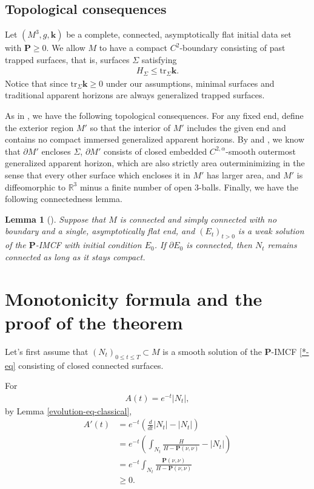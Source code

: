 \documentclass[11pt,letterpaper]{amsart}
\newtheorem{lem}[thm]{Lemma}
\theoremstyle{definition}
\theoremstyle{remark}
\newcommand{\Pten}{\mathbf P}
\newcommand{\kten}{\mathbf k}
\begin{document}
\subsection{Topological consequences}
Let $(M^3, g, \kten)$ be a complete, connected, asymptotically flat initial data set with $\Pten \geq 0$. We allow $M$ to have a compact $C^2$-boundary consisting of past trapped surfaces, that is, surfaces $\Sigma $ satisfying
\begin{align*}
	H_{\Sigma } \leq \mathrm{tr}_{\Sigma }\kten.
\end{align*} 
Notice that since $\mathrm{tr}_{\Sigma } \kten \geq 0$ under our assumptions, minimal surfaces and traditional apparent horizons are always generalized trapped surfaces. 

As in \cite[Section 5]{Dong26SigmaIMCF}, we have the following topological consequences. For any fixed end, define the exterior region $M'$ so that the interior of $M'$ includes the given end and contains no compact immersed generalized apparent horizons. By \cite[Theorem 1.1]{Eichmair10} and \cite[Theorem 5.1]{EGP13}, we know that $\partial M'$ encloses $\Sigma $, $\partial M'$ consists of closed embedded $C^{2,\alpha }$-smooth outermost generalized apparent horizon, which are also strictly area outerminimizing in the sense that every other surface which encloses it in $M'$ has larger area, and  $M'$ is diffeomorphic to $\mathbb{R}^3$ minus a finite number of open $3$-balls. Finally, we have the following connectedness lemma.
\begin{lem}[{\cite[Lemma 5.9]{Dong26SigmaIMCF}}]
			Suppose that $M$ is connected and simply connected with no boundary and a single, asymptotically flat end, and $(E_t)_{t>0}$ is a weak solution of the $\Pten $-IMCF with initial condition $E_0$. If $\partial E_0$ is connected, then $N_t$ remains connected as long as it stays compact.
\end{lem}




\section{Monotonicity formula and the proof of the theorem}
\label{section-monotone}
Let's first assume that $(N_{t})_{0 \leq t \leq T}\subset M$ is a smooth solution of the $\Pten$-IMCF \ref{*-eq} consisting of closed connected surfaces.

For 
\begin{align*}
	A(t) = e ^{-t}|N_t|,
\end{align*} 
by Lemma \ref{evolution-eq-classical}, 
\begin{align*}
	A'(t) &= e ^{-t} \left( \frac{d}{d t}|N_t| - |N_t| \right)\\
	      &= e ^{-t} \left( \int_{N_t} \frac{H}{H - \Pten(\nu ,\nu )} - |N_t| \right) \\
	      &= e ^{-t} \int_{N_t} \frac{\Pten(\nu ,\nu )}{H - \Pten(\nu ,\nu )}\\
	      & \geq 0.
\end{align*} 
\end{document}
